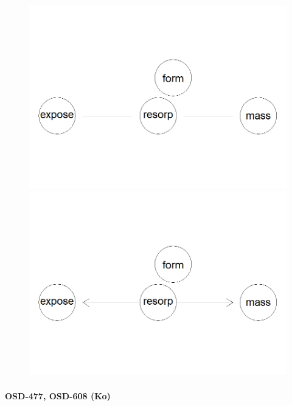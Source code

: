 \documentclass{article}
\begin{document}
\begin{figure}[h] %
    \begin{minipage}{0.45\textwidth}
        \centering
        \includegraphics[width=\linewidth]{turner.png}
    \end{minipage}
    \hfill
    \begin{minipage}{0.45\textwidth}
        \centering
        \includegraphics[width=\linewidth]{c_turner.png}
    \end{minipage}
\end{figure}


\paragraph{OSD-477, OSD-608 (Ko)}
\end{document}
